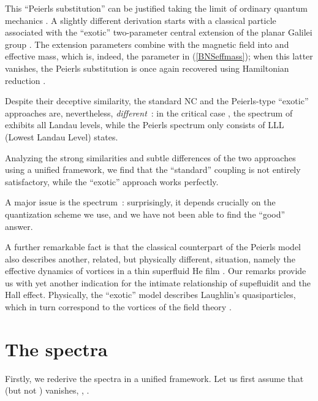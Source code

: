\documentclass[a4paper,11pt]{article}
\let\ssection=\section
\renewcommand{\section}{\setcounter{equation}{0}\ssection}
\begin{document}
This ``Peierls substitution'' can be justified taking the
\coordHE{} limit of ordinary quantum mechanics \cite{DJT, DuJa}.
A slightly different derivation
  \cite{DH}  starts with  a classical particle
  associated with the ``exotic'' two-parameter  central
extension of the planar Galilei group \cite{exotic}.
The extension parameters combine with the magnetic field
into and effective mass, which is, indeed,
  the parameter \coordHE{}  in (\ref{BNSeffmass});
when this latter
vanishes, the Peierls substitution is once again recovered
using Hamiltonian reduction \cite{FaJa}.


Despite their deceptive similarity, the standard
  NC  \cite{NaPo, GAMB, BNS} and the Peierls-type ``exotic''
  \cite{DH} approaches are, nevertheless, {\it different}~:
in the critical case \coordHE{},
the spectrum of \cite{BNS}
   exhibits all Landau levels, while the Peierls spectrum \cite{DJT,
   DuJa, DH}
  only consists of LLL (Lowest Landau Level) states.


Analyzing the strong similarities and subtle differences of
the two approaches using a unified framework, we find that the
``standard'' coupling is not entirely satisfactory,
while the ``exotic'' approach works perfectly.

A major issue is the spectrum~:
surprisingly, it depends crucially on the quantization scheme
we use, and we have not been able to find the ``good'' answer.


A further remarkable fact is that the classical counterpart of the
Peierls model \cite{DJT, DH} also
describes another, related, but physically different, situation, namely
the effective dynamics of vortices in a thin superfluid
\coordHE{}He film \cite{HMC, LeMy}. Our remarks provide us with yet
another indication for the intimate
relationship of supefluidit and the Hall effect.
Physically, the ``exotic'' model describes
Laughlin's quasiparticles,  which in turn correspond
to the vortices of the field theory \cite{QHE}.


\section{The spectra}

Firstly, we rederive the spectra in a unified framework.
Let us first assume that \coordHE{} (but not \coordHE{}) vanishes,
\coordHE{}, \coordHE{}.
\end{document}
